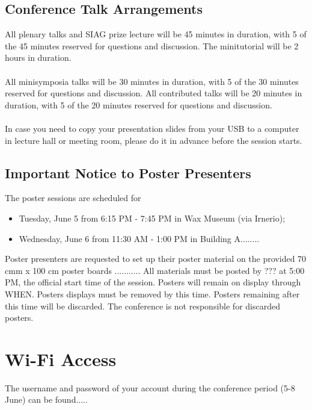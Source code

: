 \begin{multicols}{2}
\subsection*{Conference Talk Arrangements}
All plenary talks and SIAG prize lecture will be 45 minutes in duration,
with 5 of the 45 minutes reserved for questions and discussion.
The minitutorial will be 2 hours in duration.\\\\
All minisymposia talks will be 30 minutes in duration, with 5 of the 30
minutes reserved for questions and discussion.
All contributed talks will be 20 minutes in duration, with 5 of the 20
minutes reserved for questions and discussion.\\\\
In case you need to copy your presentation slides from your USB to a
computer in lecture hall or meeting room, please do it in advance before
the session starts.

\subsection*{Important Notice to Poster Presenters}
The poster sessions are scheduled for
\begin{itemize}
\item Tuesday, June 5 from 6:15 PM - 7:45 PM in Wax Museum (via Irnerio);
\item Wednesday, June 6 from 11:30 AM - 1:00 PM in Building A........
\end{itemize} Poster
presenters are requested to set up
their poster material on the provided
70 cmm x 100 cm poster boards ........... 
All materials must
be posted by ??? at
5:00 PM, the official start time of
the session. Posters will remain on display through WHEN.
Posters displays must be removed by this time. Posters remaining after this time will be discarded.
The conference is not responsible for
discarded posters.

\section*{Wi-Fi Access}
The username and password of your account during the conference period (5-8 June) can be found.....


\end{multicols}

